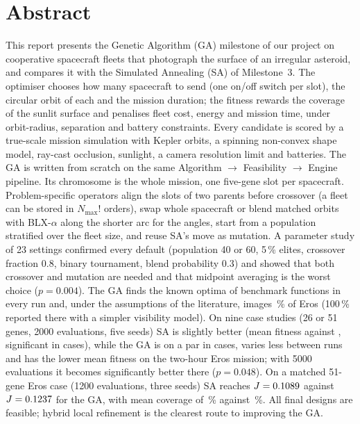 \chapter*{Abstract}
\label{chap:abstract}
\pagestyle{plain}
This report presents the Genetic Algorithm (GA) milestone of our project on cooperative spacecraft
fleets that photograph the surface of an irregular asteroid, and compares it with the Simulated
Annealing (SA) of Milestone~3. The optimiser chooses how many spacecraft to send (one on/off switch
per slot), the circular orbit of each and the mission duration; the fitness rewards the coverage of
the sunlit surface and penalises fleet cost, energy and mission time, under orbit-radius, separation
and battery constraints. Every candidate is scored by a true-scale mission simulation with Kepler
orbits, a spinning non-convex shape model, ray-cast occlusion, sunlight, a camera resolution limit
and batteries.
The GA is written from scratch on the same Algorithm $\rightarrow$ Feasibility $\rightarrow$ Engine
pipeline. Its chromosome is the whole mission, one five-gene slot per spacecraft. Problem-specific
operators align the slots of two parents before crossover (a fleet can be stored in $N_{\max}!$
orders), swap whole spacecraft or blend matched orbits with BLX-$\alpha$ along the shorter arc for the
angles, start from a population stratified over the fleet size, and reuse SA's move as mutation.
A parameter study of 23 settings confirmed every default (population 40 or 60, 5\,\% elites, crossover
fraction 0.8, binary tournament, blend probability 0.3) and showed that both crossover and mutation are
needed and that midpoint averaging is the worst choice ($p=0.004$).
The GA finds the known optima of benchmark functions in every run and, under the assumptions of
the literature, images \gaAllLitC\,\% of Eros (100\,\% reported there with a simpler visibility model).
On nine case studies (26 or 51 genes, 2000 evaluations, five seeds) SA is slightly better (mean
fitness \saMeanJ{} against \gaMeanJ, significant in \saWins{} cases), while the GA is on a par in
\gaTies{} cases, varies less between runs and has the lower mean fitness on the two-hour Eros
mission; with 5000 evaluations it becomes significantly better there ($p=0.048$). On a matched
51-gene Eros case (1200 evaluations, three seeds) SA reaches $J=0.1089$ against
$J=0.1237$ for the GA, with mean coverage of \saMatchedC\,\% against \gaMatchedC\,\%. All final
designs are feasible; hybrid local refinement is the clearest route to improving the GA.
